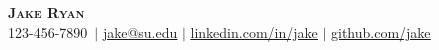 \newcommand{\MyName}{Jake Ryan}
\newcommand{\MyPhone}{123-456-7890}
\newcommand{\MyEmail}{jake@su.edu}
\newcommand{\MyLinkedIn}{linkedin.com/in/jake}
\newcommand{\MyGitHub}{github.com/jake}

\begin{center}
    \textbf{\Huge \scshape \MyName} \\ \vspace{1pt}
    \small \MyPhone\ $|$ 
    \href{mailto:\MyEmail}{\underline{\MyEmail}} $|$ 
    \href{https://\MyLinkedIn}{\underline{\MyLinkedIn}} $|$
    \href{https://\MyGitHub}{\underline{\MyGitHub}}
\end{center}
